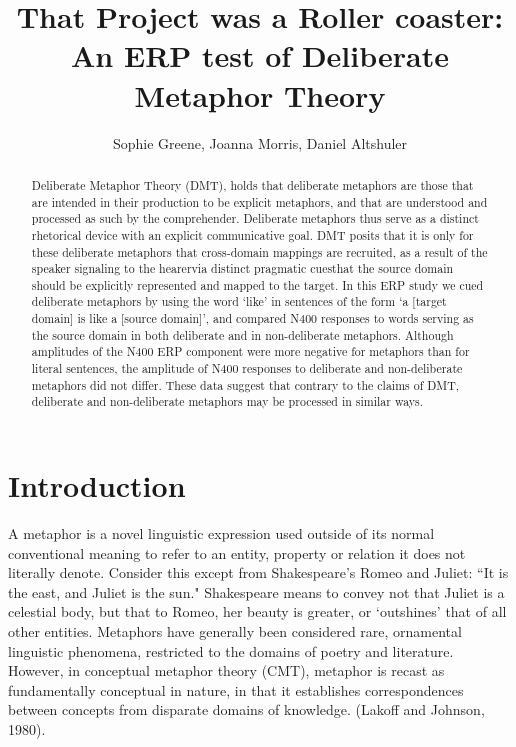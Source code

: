 \documentclass[]{article}
\title{That Project was a Roller coaster: An ERP test of Deliberate Metaphor Theory}
\author{Sophie Greene, Joanna Morris, Daniel Altshuler}
\begin{document}
\maketitle

\begin{abstract}

	Deliberate Metaphor Theory (DMT), holds that deliberate metaphors are those that are intended in their production to be explicit metaphors, and that are understood and processed as such by the comprehender. Deliberate metaphors thus serve as a distinct rhetorical device with an explicit communicative goal. DMT posits that it is only for these deliberate metaphors that cross-domain mappings are recruited, as a result of the speaker signaling to the hearer\textemdash via distinct pragmatic cues\textemdash that the source domain should be explicitly represented and mapped to the target. In this ERP study we cued deliberate metaphors by using the word ‘like’ in sentences of the form ‘a [target domain] is like a [source domain]’, and compared N400 responses to words serving as the source domain in both deliberate and in non-deliberate metaphors. Although amplitudes of the N400 ERP component were more negative for metaphors than for literal sentences, the amplitude of N400 responses to deliberate and non-deliberate metaphors did not differ. These data suggest that contrary to the claims of DMT, deliberate and non-deliberate metaphors may be processed in similar ways.

\end{abstract}

\section{Introduction}

	
    A metaphor is a novel linguistic expression used outside of its normal conventional meaning to refer to an entity, property or relation it does not literally denote. Consider this except from Shakespeare's Romeo and Juliet: ``It is the east, and Juliet is the sun."  Shakespeare means to convey not that Juliet is a celestial body, but that to Romeo, her beauty is greater, or `outshines' that of all other entities.  
	Metaphors have generally been considered rare, ornamental linguistic phenomena, restricted to the domains of poetry and literature.  However, in conceptual metaphor theory (CMT), metaphor is recast as fundamentally conceptual in nature, in that it establishes correspondences between concepts from disparate domains of knowledge. (Lakoff and Johnson, 1980). 
	
\end{document}
